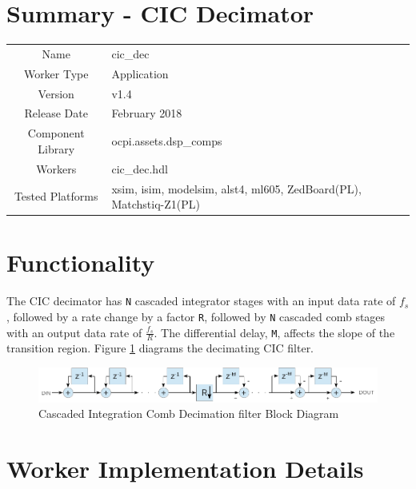 \documentclass{article}
\author{} %
\date{Version \docVersion} %
\title{\docTitle}
\def\docVersion{1.4}
\def\comp{cic\_dec}
\def\Comp{CIC Decimator}
\begin{document}
\section*{Summary - \Comp}
\begin{tabular}{|c|M{13.5cm}|}
	\hline
	                  &                                                    \\
	\hline
	Name              & \comp                                              \\
	\hline
	Worker Type       & Application                                        \\
	\hline
	Version           & v\docVersion \\
	\hline
	Release Date      & February 2018 \\
	\hline
	Component Library & ocpi.assets.dsp\_comps                              \\
	\hline
	Workers           & \comp.hdl                                          \\
	\hline
	Tested Platforms  & xsim, isim, modelsim, alst4, ml605, ZedBoard(PL), Matchstiq-Z1(PL) \\
	\hline
\end{tabular}

\section*{Functionality}
\begin{flushleft}
	The CIC decimator has \verb+N+ cascaded integrator stages with an input data rate of $f_{s}$, followed by a rate change by a factor \verb+R+, followed by \verb+N+ cascaded comb stages with an output data rate of $\frac{f_{s}}{R}$. The differential delay, \verb+M+, affects the slope of the transition region. Figure \ref{fig:cic} diagrams the decimating CIC filter.

	\begin{figure}[ht]
		\centering
		\includegraphics[scale=.6]{cic_decimator_block_diagram}
		\caption{Cascaded Integration Comb Decimation filter Block Diagram}
		\label{fig:cic}
	\end{figure}
\end{flushleft}

\section*{Worker Implementation Details}
\end{document}
